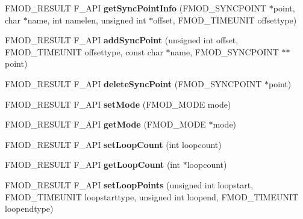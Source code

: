 \begin{DoxyCompactItemize}
\item 
\mbox{\label{classFMOD_1_1Sound_a99aa787828a6fa111ba2663a3c35b6e0}} 
F\+M\+O\+D\+\_\+\+R\+E\+S\+U\+LT F\+\_\+\+A\+PI {\bfseries get\+Sync\+Point\+Info} (F\+M\+O\+D\+\_\+\+S\+Y\+N\+C\+P\+O\+I\+NT $\ast$point, char $\ast$name, int namelen, unsigned int $\ast$offset, F\+M\+O\+D\+\_\+\+T\+I\+M\+E\+U\+N\+IT offsettype)
\item 
\mbox{\label{classFMOD_1_1Sound_abb46f258c1ac4563f20b17a4647b0dc0}} 
F\+M\+O\+D\+\_\+\+R\+E\+S\+U\+LT F\+\_\+\+A\+PI {\bfseries add\+Sync\+Point} (unsigned int offset, F\+M\+O\+D\+\_\+\+T\+I\+M\+E\+U\+N\+IT offsettype, const char $\ast$name, F\+M\+O\+D\+\_\+\+S\+Y\+N\+C\+P\+O\+I\+NT $\ast$$\ast$point)
\item 
\mbox{\label{classFMOD_1_1Sound_a21e86318ac39e576111e642b57db4187}} 
F\+M\+O\+D\+\_\+\+R\+E\+S\+U\+LT F\+\_\+\+A\+PI {\bfseries delete\+Sync\+Point} (F\+M\+O\+D\+\_\+\+S\+Y\+N\+C\+P\+O\+I\+NT $\ast$point)
\item 
\mbox{\label{classFMOD_1_1Sound_a8410551349a26de45abe6a931ea6965a}} 
F\+M\+O\+D\+\_\+\+R\+E\+S\+U\+LT F\+\_\+\+A\+PI {\bfseries set\+Mode} (F\+M\+O\+D\+\_\+\+M\+O\+DE mode)
\item 
\mbox{\label{classFMOD_1_1Sound_ae8bfe6364a2283c43c21f03d43daafe5}} 
F\+M\+O\+D\+\_\+\+R\+E\+S\+U\+LT F\+\_\+\+A\+PI {\bfseries get\+Mode} (F\+M\+O\+D\+\_\+\+M\+O\+DE $\ast$mode)
\item 
\mbox{\label{classFMOD_1_1Sound_af5da99ae0aff53b50910a36e3510d7ba}} 
F\+M\+O\+D\+\_\+\+R\+E\+S\+U\+LT F\+\_\+\+A\+PI {\bfseries set\+Loop\+Count} (int loopcount)
\item 
\mbox{\label{classFMOD_1_1Sound_a8ed3b79d45f937d215a84e52c2be4891}} 
F\+M\+O\+D\+\_\+\+R\+E\+S\+U\+LT F\+\_\+\+A\+PI {\bfseries get\+Loop\+Count} (int $\ast$loopcount)
\item 
\mbox{\label{classFMOD_1_1Sound_ae4ed822496a4bd387e8384aec67e33f9}} 
F\+M\+O\+D\+\_\+\+R\+E\+S\+U\+LT F\+\_\+\+A\+PI {\bfseries set\+Loop\+Points} (unsigned int loopstart, F\+M\+O\+D\+\_\+\+T\+I\+M\+E\+U\+N\+IT loopstarttype, unsigned int loopend, F\+M\+O\+D\+\_\+\+T\+I\+M\+E\+U\+N\+IT loopendtype)
$$
\end{DoxyCompactItemize}
